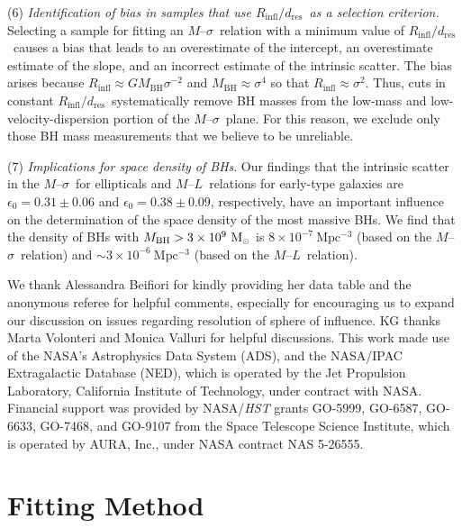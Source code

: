 \documentclass[twosided,letterpaper,numberedappendix]{emulateapj}
\newcommand{\msun}     {\ensuremath{{\rm M}_{\scriptscriptstyle \odot}}}
\newcommand{\msigma}   {\ensuremath{M}{--}\ensuremath{\sigma}}
\newcommand{\ml}       {\ensuremath{M}{--}\ensuremath{L}}
\newcommand{\mbh}      {\ensuremath{M_{\mathrm{BH}}}}
\newcommand{\mlscaterr} {\ensuremath{0.38 \pm 0.09}}
\newcommand{\rinfres} {\ensuremath{R_{\mathrm{infl}} / d_{\mathrm{res}}}}
\begin{document}
(6) \emph{Identification of bias in samples that use \rinfres\ as a
   selection criterion.}  Selecting a sample for fitting an \msigma\
   relation with a minimum value of \rinfres\ causes a bias that leads
   to an overestimate of the intercept, an overestimate estimate of the
   slope, and an incorrect estimate of the intrinsic scatter.  The bias
   arises because $R_{\mathrm{infl}} \approx G\mbh\sigma^{-2}$ and $\mbh
   \approx \sigma^4$ so that $R_{\mathrm{infl}} \approx \sigma^2$.  Thus,
   cuts in constant \rinfres\ systematically remove BH masses
   from the low-mass and low-velocity-dispersion portion of the
   \msigma\ plane.  For this reason, we exclude only those BH
   mass measurements that we believe to be unreliable.


(7) \emph{Implications for space density of BHs}.  Our findings that
   the intrinsic scatter in the \msigma\ for ellipticals and \ml\
   relations for early-type galaxies are $\epsilon_0 = 0.31 \pm 0.06$
   and $\epsilon_0 = \mlscaterr$, respectively, have an important
   influence on the determination of the space density of the most
   massive BHs.  We find that the density of BHs with $\mbh >
   3\times10^{9}~\msun$ is $8 \times 10^{-7}~\mathrm{Mpc^{-3}}$
   (based on the \msigma\ relation) and $\sim
   3\times10^{-6}~\mathrm{Mpc^{-3}}$ (based on the \ml\ relation).


\acknowledgements We thank Alessandra Beifiori for kindly providing
her data table and the anonymous referee for helpful comments,
especially for encouraging us to expand our discussion on issues
regarding resolution of sphere of influence.  KG thanks Marta Volonteri
and Monica Valluri for helpful discussions.  This work made use of the
NASA's Astrophysics Data System (ADS), and the NASA/IPAC Extragalactic
Database (NED), which is operated by the Jet Propulsion Laboratory,
California Institute of Technology, under contract with
NASA. Financial support was provided by NASA/{\it HST} grants GO-5999,
GO-6587, GO-6633, GO-7468, and GO-9107 from the Space Telescope
Science Institute, which is operated by AURA, Inc., under NASA
contract NAS 5-26555.

\appendix

\section{Fitting Method}
\label{analysis}
\end{document}
